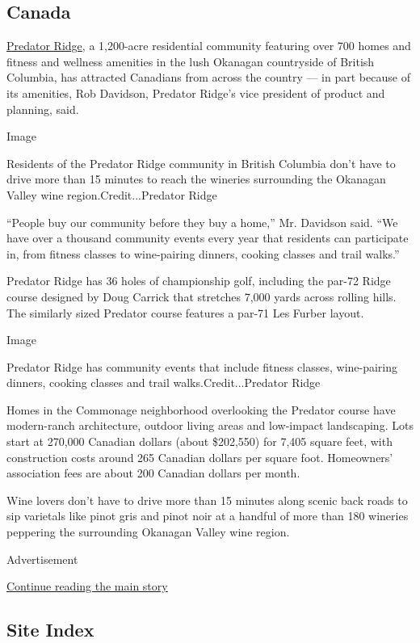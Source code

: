 \hypertarget{canada}{%
\subsection{Canada}\label{canada}}

\href{https://www.predatorridge.com/}{Predator Ridge}, a 1,200-acre
residential community featuring over 700 homes and fitness and wellness
amenities in the lush Okanagan countryside of British Columbia, has
attracted Canadians from across the country --- in part because of its
amenities, Rob Davidson, Predator Ridge's vice president of product and
planning, said.

Image

Residents of the Predator Ridge community in British Columbia don't have
to drive more than 15 minutes to reach the wineries surrounding the
Okanagan Valley wine region.Credit...Predator Ridge

``People buy our community before they buy a home,'' Mr. Davidson said.
``We have over a thousand community events every year that residents can
participate in, from fitness classes to wine-pairing dinners, cooking
classes and trail walks.''

Predator Ridge has 36 holes of championship golf, including the par-72
Ridge course designed by Doug Carrick that stretches 7,000 yards across
rolling hills. The similarly sized Predator course features a par-71 Les
Furber layout.

Image

Predator Ridge has community events that include fitness classes,
wine-pairing dinners, cooking classes and trail walks.Credit...Predator
Ridge

Homes in the Commonage neighborhood overlooking the Predator course have
modern-ranch architecture, outdoor living areas and low-impact
landscaping. Lots start at 270,000 Canadian dollars (about \$202,550)
for 7,405 square feet, with construction costs around 265 Canadian
dollars per square foot. Homeowners' association fees are about 200
Canadian dollars per month.

Wine lovers don't have to drive more than 15 minutes along scenic back
roads to sip varietals like pinot gris and pinot noir at a handful of
more than 180 wineries peppering the surrounding Okanagan Valley wine
region.

Advertisement

\protect\hyperlink{after-bottom}{Continue reading the main story}

\hypertarget{site-index}{%
\subsection{Site Index}\label{site-index}}

